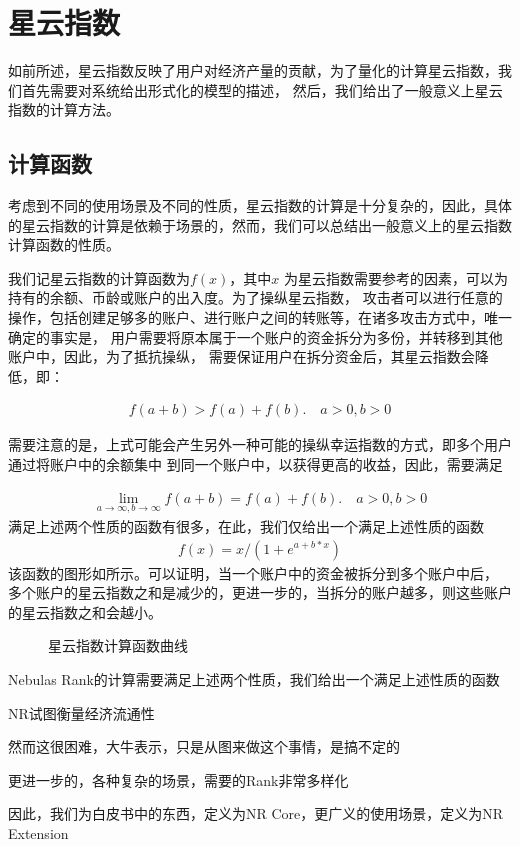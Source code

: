 \section{星云指数}
如前所述，星云指数反映了用户对经济产量的贡献，为了量化的计算星云指数，我们首先需要对系统给出形式化的模型的描述，
然后，我们给出了一般意义上星云指数的计算方法。


\subsection{计算函数}
考虑到不同的使用场景及不同的性质，星云指数的计算是十分复杂的，因此，具体的星云指数的计算是依赖于场景的，然而，我们可以总结出一般意义上的星云指数计算函数的性质。

我们记星云指数的计算函数为\(f(x)\)，其中\(x\)
为星云指数需要参考的因素，可以为持有的余额、币龄或账户的出入度。为了操纵星云指数，
攻击者可以进行任意的操作，包括创建足够多的账户、进行账户之间的转账等，在诸多攻击方式中，唯一确定的事实是，
{\color{red} 用户需要将原本属于一个账户的资金拆分为多份，并转移到其他账户中}，因此，为了抵抗操纵，
需要保证用户在拆分资金后，其星云指数会降低，即：

\begin{align}
f(a + b) > f(a) + f(b).\quad a>0, b>0
\end{align}

需要注意的是，上式可能会产生另外一种可能的操纵幸运指数的方式，即多个用户通过将账户中的余额集中
到同一个账户中，以获得更高的收益，因此，需要满足

\begin{align}
\lim\limits_{a \to \infty, b\to \infty} f(a+b) = f(a) + f(b).\quad a>0, b>0
\end{align}
满足上述两个性质的函数有很多，在此，我们仅给出一个满足上述性质的函数
\begin{align}
f(x) = x/(1 + e^{a + b*x})
\end{align}
\noindent 该函数的图形如所示。可以证明，当一个账户中的资金被拆分到多个账户中后，
多个账户的星云指数之和是减少的，更进一步的，当拆分的账户越多，则这些账户的星云指数之和会越小。

\begin{figure}
\centering
{}
\caption{星云指数计算函数曲线}
\label{fig-nr}
\end{figure}

Nebulas Rank的计算需要满足上述两个性质，我们给出一个满足上述性质的函数





NR试图衡量经济流通性

然而这很困难，大牛表示，只是从图来做这个事情，是搞不定的

更进一步的，各种复杂的场景，需要的Rank非常多样化

因此，我们为白皮书中的东西，定义为NR Core，更广义的使用场景，定义为NR Extension
